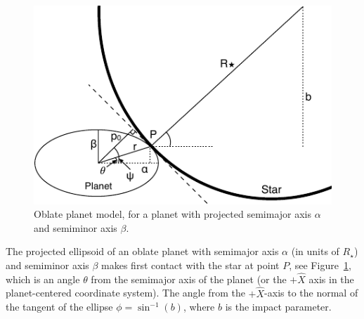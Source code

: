 \begin{figure}
    \centering
    \includegraphics[scale=0.9]{robin/oblate.pdf}
    \caption{Oblate planet model, for a planet with projected semimajor axis $\alpha$ and semiminor axis $\beta$.}
    \label{fig:oblate}
\end{figure}

The projected ellipsoid of an oblate planet with semimajor axis $\alpha$ (in units of $R_\star$) and semiminor axis $\beta$ makes first contact with the star at point $P$, see Figure~\ref{fig:oblate}, which is an angle $\theta$ from the semimajor axis of the planet (or the $+\hat{X}$ axis in the planet-centered coordinate system). The angle from the $+\hat{X}$-axis to the normal of the tangent of the ellipse $\phi = \sin^{-1}(b)$, where $b$ is the impact parameter. 

